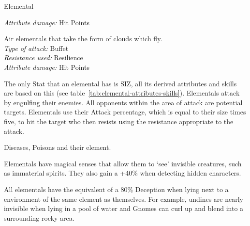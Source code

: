 \begin{monsterbox}{Elemental}
\begin{rpg-monsteraction}[Gnomes]
		\textit{Attribute damage:} Hit Points
	\end{rpg-monsteraction}
	\begin{rpg-monsteraction}[Sylphs]
		Air elementals that take the form of clouds which fly.\\
		\textit{Type of attack:} Buffet\\
		\textit{Resistance used:} Resilience\\
		\textit{Attribute damage:} Hit Points
	\end{rpg-monsteraction}
	\begin{rpg-monsteraction}[Attributes]
		The only Stat that an elemental has is SIZ, all its derived attributes and skills are based on this (see table~\ref{tab:elemental-attributes-skills}). Elementals attack by engulfing their enemies. All opponents within the area of attack are potential targets. Elementals use their Attack percentage, which is equal to their size times five, to hit the target who then resists using the resistance appropriate to the attack.
	\end{rpg-monsteraction}
	\begin{rpg-monsteraction}[Immunities]
		Diseases, Poisons and their element.
	\end{rpg-monsteraction}
	\begin{rpg-monsteraction}
		Elementals have magical senses that allow them to ‘see’ invisible creatures, such as immaterial spirits. They also gain a +40\% when detecting hidden characters.
	\end{rpg-monsteraction}
	\begin{rpg-monsteraction}[Camouflage]
		All elementals have the equivalent of a 80\% Deception when lying next to a environment of the same element as themselves. For example, undines are nearly invisible when lying in a pool of water and Gnomes can curl up and blend into a surrounding rocky area.
	\end{rpg-monsteraction}

\end{monsterbox}



